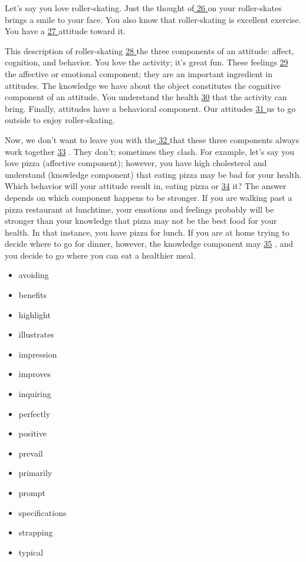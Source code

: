 \documentclass[UTF8,11pt]{ctexart}
\begin{document}
Let’s say you love roller-skating. Just the thought of\uline{ 26 }on your roller-skates brings a smile to your face. You also know that roller-skating is excellent exercise. You have a \uline{27 }attitude toward it.


This description of roller-skating \uline{28 }the three components of an attitude: affect, cognition, and behavior. You love the activity; it’s great fun. These feelings \uline{29 }the affective or emotional component; they are an important ingredient in attitudes. The knowledge we have about the object constitutes the cognitive component of an attitude. You understand the health \uline{30} that the activity can bring. Finally, attitudes have a behavioral component. Our attitudes \uline{31 }us to go outside to enjoy roller-skating.


Now, we don’t want to leave you with the\uline{ 32 }that these three components always work together \uline{33} . They don’t; sometimes they clash. For example, let’s say you love pizza (affective component); however, you have high cholesterol and understand (knowledge component) that eating pizza may be bad for your health. Which behavior will your attitude result in, eating pizza or \uline{34} it? The answer depends on which component happens to be stronger. If you are walking past a pizza restaurant at lunchtime, your emotions and feelings probably will be stronger than your knowledge that pizza may not be the best food for your health. In that instance, you have pizza for lunch. If you are at home trying to decide where to go for dinner, however, the knowledge component may \uline{35} , and you decide to go where you can eat a healthier meal.


\begin{itemize}[leftmargin=2em,itemsep=.2em,topsep=.4em]\item[A.] avoiding
\item[B.] benefits
\item[C.] highlight
\item[D.] illustrates
\item[E.] impression
\item[F.] improves
\item[G.] inquiring
\item[H.] perfectly
\item[I.] positive
\item[J.] prevail
\item[K.] primarily
\item[L.] prompt
\item[M.] specifications
\item[N.] strapping
\item[O.] typical
\end{itemize}
\end{document}
